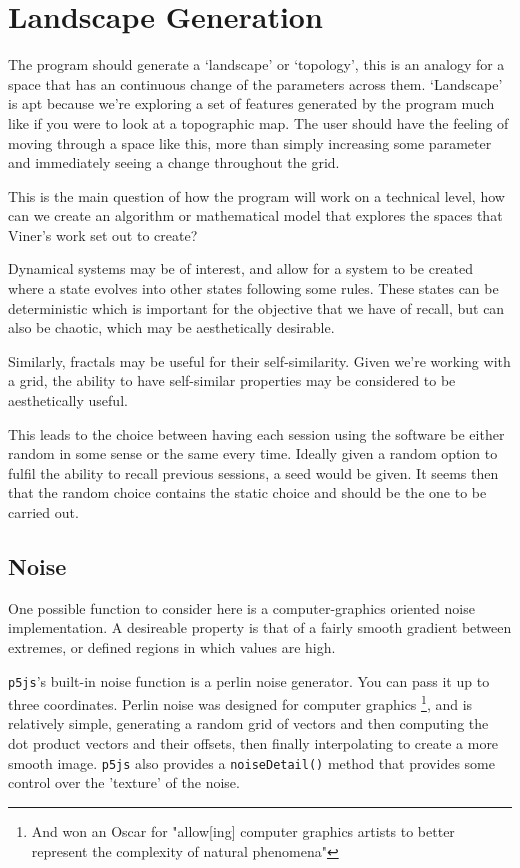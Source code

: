 \section{Landscape Generation}
The program should generate a `landscape' or `topology', this is an analogy for
a space that has an continuous change of the parameters across them. `Landscape'
is apt because we're exploring a set of features generated by the program much
like if you were to look at a topographic map. The user should have the feeling
of moving through a space like this, more than simply increasing some parameter
and immediately seeing a change throughout the grid.

This is the main question of how the program will work on a technical level, how
can we create an algorithm or mathematical model that explores the spaces that
Viner's work set out to create?

Dynamical systems may be of interest, and allow for a system to be created where
a state evolves into other states following some rules. These states can be
deterministic which is important for the objective that we have of recall, but
can also be chaotic, which may be aesthetically desirable.

Similarly, fractals may be useful for their self-similarity. Given we're working
with a grid, the ability to have self-similar properties may be considered to be
aesthetically useful.



This leads to the choice between having each session using the software be
either random in some sense or the same every time. Ideally given a random
option to fulfil the ability to recall previous sessions, a seed would be given.
It seems then that the random choice contains the static choice and should be
the one to be carried out.

\subsection{Noise}
One possible function to consider here is a computer-graphics oriented noise
implementation. A desireable property is that of a fairly smooth gradient
between extremes, or defined regions in which values are high.

\verb|p5js|'s built-in noise function is a perlin noise generator. You can pass
it up to three coordinates. Perlin noise was designed for computer graphics
\footnote{And won an Oscar for "allow[ing] computer graphics artists to better
represent the complexity of natural phenomena"}, and is relatively simple,
generating a random grid of vectors and then computing the dot product vectors
and their offsets, then finally interpolating to create a more smooth image.
\verb|p5js| also provides a \verb|noiseDetail()| method that provides some
control over the 'texture' of the noise.



